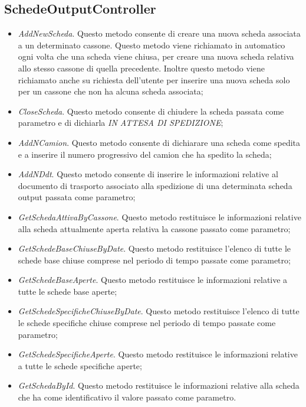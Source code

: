   \subsection{SchedeOutputController}
  \begin{itemize}
    \item \textit{AddNewScheda}. Questo metodo consente di creare una nuova scheda associata a un determinato cassone.
    Questo metodo viene richiamato in automatico ogni volta che una scheda viene chiusa, per creare una nuova scheda
    relativa allo stesso cassone di quella precedente. Inoltre questo metodo viene richiamato anche su richiesta
    dell'utente per inserire una nuova scheda solo per un cassone che non ha alcuna scheda associata;
    \item \textit{CloseScheda}. Questo metodo consente di chiudere la scheda passata come parametro e di dichiarla
    \textit{IN ATTESA DI SPEDIZIONE};
    \item \textit{AddNCamion}. Questo metodo consente di dichiarare una scheda come spedita e a inserire il numero
    progressivo del camion che ha spedito la scheda;
    \item \textit{AddNDdt}. Questo metodo consente di inserire le informazioni relative al documento di trasporto
    associato alla spedizione di una determinata scheda output passata come parametro;
    \item \textit{GetSchedaAttivaByCassone}. Questo metodo restituisce le informazioni relative alla scheda
    attualmente aperta relativa la cassone passato come parametro;
    \item \textit{GetSchedeBaseChiuseByDate}. Questo metodo restituisce l'elenco di tutte le schede base chiuse
    comprese nel periodo di tempo passate come parametro;
    \item \textit{GetSchedeBaseAperte}. Questo metodo restituisce le informazioni relative a tutte le schede base aperte;
    \item \textit{GetSchedeSpecificheChiuseByDate}. Questo metodo restituisce l'elenco di tutte le schede specifiche
    chiuse comprese nel periodo di tempo passate come parametro;
    \item \textit{GetSchedeSpecificheAperte}. Questo metodo restituisce le informazioni relative a tutte le schede
    specifiche aperte;
    \item \textit{GetSchedaById}. Questo metodo restituisce le informazioni relative alla scheda che ha come
    identificativo il valore passato come parametro.
  \end{itemize}



